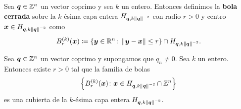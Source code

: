 \begin{definition}
	\label{fin:def:ball}
	Sea $\boldsymbol{q} \in \mathbb{Z}^n$ un vector coprimo y sea $k$ un entero. Entonces definimos la
	\textbf{bola cerrada} sobre la $k$-ésima capa entera $H_{\boldsymbol{q}, k\left\lVert \boldsymbol{q} \right\rVert^{-2}}$ con
	radio $r > 0$ y centro $\boldsymbol{x} \in H_{\boldsymbol{q}, k\left\lVert \boldsymbol{q} \right\rVert^{-2}}$ como
	\begin{equation}
		\label{eq:k-ball}
		B_r^{(k)}(\boldsymbol{x}) \coloneq \lbrace \boldsymbol{y} \in \mathbb{R}^n \colon \left\lVert \boldsymbol{y} - \boldsymbol{x} \right\rVert \leq r
		\rbrace \cap H_{\boldsymbol{q}, k \left\lVert \boldsymbol{q} \right\rVert^{-2}}.
	\end{equation}
\end{definition}
\begin{theorem}
	\label{lemma:ball-cover}
	Sea $\boldsymbol{q} \in \mathbb{Z}^n$ un vector coprimo y supongamos que $q_n \neq 0$. Sea $k$ un entero.
	Entonces existe $r > 0$ tal que la familia de bolas
	\begin{equation*}
		\left\lbrace B_r^{(k)}(\boldsymbol{x}) \colon \boldsymbol{x} \in H_{\boldsymbol{q}, k\left\lVert \boldsymbol{q} \right\rVert^{-2}} \cap
			\mathbb{Z}^n \right\rbrace
	\end{equation*}
	es una cubierta de la $k$-ésima capa entera $H_{\boldsymbol{q}, k\left\lVert \boldsymbol{q} \right\rVert^{-2}}$.
\end{theorem}
